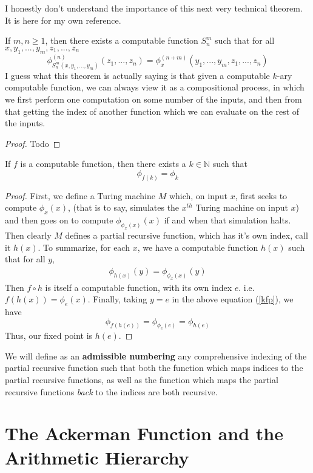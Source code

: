 I honestly don't understand the importance of this next very technical theorem. It is here for my own reference.
\begin{theorem}
    If $m,n \geq 1$, then there exists a computable function $S_n^m$ such that for all $x,y_1,...,y_m,z_1,...,z_n$
    \[ \phi_{S_n^m(x,y_1,...,y_m)}^{(n)}(z_1,...,z_n) = \phi_x^{(n+m)}(y_1,...,y_m,z_1,...,z_n) \]
    I guess what this theorem is actually saying is that given a computable $k$-ary computable function, we can always view it as a compositional process, in which we first perform one computation on some number of the inputs, and then from that getting the index of another function which we can evaluate on the rest of the inputs.
\end{theorem}
\begin{proof}
 Todo
\end{proof}
\begin{theorem}
    If $f$ is a computable function, then there exists a $k \in \mathbb{N}$ such that 
    \[ \phi_{f(k)} = \phi_k \]
\end{theorem}
\begin{proof}
    First, we define a Turing machine $M$ which, on input $x$, first seeks to compute $\phi_x(x)$, (that is to say, simulates the $x^{th}$ Turing machine on input $x$) and then goes on to compute $\phi_{\phi_x(x)}(x)$ if and when that simulation halts. Then clearly $M$ defines a partial recursive function, which has it's own index, call it $h(x)$. To summarize, for each $x$, we have a computable function $h(x)$ such that for all $y$,
    \begin{align}
        \phi_{h(x)}(y) = \phi_{\phi_x(x)}(y) \label{kfp}
    \end{align}
    Then $f \circ h$ is itself a computable function, with its own index $e$. i.e. $f(h(x)) = \phi_e(x)$. Finally, taking $y = e$ in the above equation (\ref{kfp}), we have 
    \[ \phi_{f(h(e))} = \phi_{\phi_e(e)} = \phi_{h(e)} \]
    Thus, our fixed point is $h(e)$.
\end{proof}
\par We will define as an \textbf{admissible numbering} any comprehensive indexing of the partial recursive function such that both the function which maps indices to the partial recursive functions, as well as the function which maps the partial recursive functions \textit{back} to the indices are both recursive. 
\section{The Ackerman Function and the Arithmetic Hierarchy}

